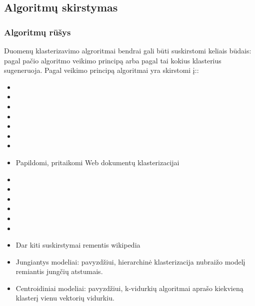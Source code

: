 \documentclass{VUMIFInfKursinis}
\begin{document}
	


	\subsection{Algoritmų skirstymas}


	\subsubsection{Algoritmų rūšys}
	Duomenų klasterizavimo algroritmai bendrai gali būti suskirstomi keliais būdais: pagal pačio algoritmo veikimo principą arba pagal tai kokius klasterius sugeneruoja.
	Pagal veikimo principą algoritmai yra skirstomi į:\cite{kadhim2014text}: 
	\begin{itemize}
		\item {}
		\item {}
		\item {}
		\item {}
		\item {}
		\item {}
		\item {}
		\item Papildomi, pritaikomi Web dokumentų klasterizacijai\cite{oikonomakou2005review} 
		\item {}
		\item {}
		\item {}
		\item {}
		\item {}
		\item
		\item Dar kiti suskirstymai rementis wikipedia
		\item Jungiantys modeliai: pavyzdžiui, hierarchinė klasterizacija nubraižo modelį remiantis jungčių atstumais.
		\item Centroidiniai modeliai: pavyzdžiui, k-vidurkių algoritmai aprašo kiekvieną klasterį vienu vektorių vidurkiu.

\end{itemize}
\end{document}

